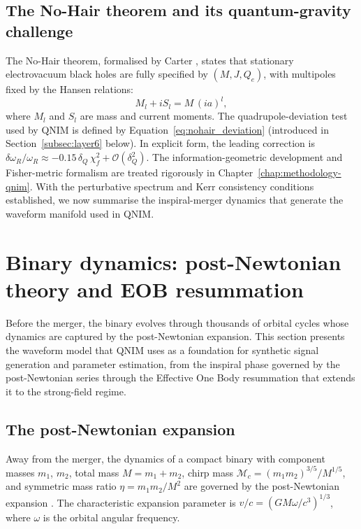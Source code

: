 \documentclass[11pt,a4paper, english]{book}
\theoremstyle{plain}
\theoremstyle{definition}
\numberwithin{equation}{chapter}
\numberwithin{figure}{chapter}
\numberwithin{table}{chapter}
\begin{document}
\subsection{The No-Hair theorem and its quantum-gravity challenge}
\label{subsec:no-hair}

The No-Hair theorem, formalised by Carter \citeyear{Carter_1971}, states that stationary electrovacuum black holes are fully specified by $(M,J,Q_e)$, with multipoles fixed by the Hansen relations:
\begin{equation}
  \label{eq:hansen}
  M_l + iS_l = M\,(ia)^l,
\end{equation}
where $M_l$ and $S_l$ are mass and current moments. The quadrupole-deviation test used by QNIM is defined by 
Equation~\eqref{eq:nohair_deviation} (introduced in 
Section~\ref{subsec:layer6} below).
In explicit form, the leading correction is $\delta\omega_R/\omega_R \approx -0.15\,\delta_Q\,\chi_f^2 + \mathcal{O}(\delta_Q^2)$.
The information-geometric development and Fisher-metric 
formalism are treated rigorously in 
Chapter~\ref{chap:methodology-qnim}.
With the perturbative spectrum and Kerr consistency conditions established, we now summarise the inspiral-merger dynamics that generate the waveform manifold used in QNIM.

\section{Binary dynamics: post-Newtonian theory and EOB resummation}
\label{sec:pn-eob}
Before the merger, the binary evolves through thousands of orbital cycles whose dynamics are captured by the post-Newtonian expansion. This section presents the waveform model that QNIM uses as a foundation for synthetic signal generation and parameter estimation, from the inspiral phase governed by the post-Newtonian series through the Effective One Body resummation that extends it to the strong-field regime.
\subsection{The post-Newtonian expansion}
\label{subsec:pn}

Away from the merger, the dynamics of a compact binary with component masses
$m_1$, $m_2$, total mass $M = m_1 + m_2$, chirp mass
$\mathcal{M}_c = (m_1 m_2)^{3/5}/M^{1/5}$, and symmetric mass ratio
$\eta = m_1 m_2/M^2$ are governed by the post-Newtonian expansion
\cite{Blanchet_2014}.  The characteristic expansion parameter is
$v/c = (G M\omega / c^3)^{1/3}$, where $\omega$ is the orbital angular
frequency.
\end{document}
